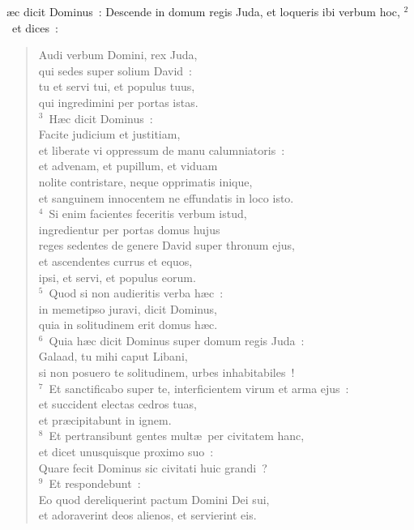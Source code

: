\bchapter
{}\ae c dicit Dominus~: Descende in domum regis Juda, et loqueris ibi verbum hoc,
${}^{2}$~et dices~: \begin{verse}Audi verbum Domini, rex Juda,\\ qui sedes super solium David~:\\ tu et servi tui, et populus tuus,\\ qui ingredimini per portas istas.\\
${}^{3}$~H\ae c dicit Dominus~:\\ Facite judicium et justitiam,\\ et liberate vi oppressum de manu calumniatoris~:\\ et advenam, et pupillum, et viduam\\ nolite contristare, neque opprimatis inique,\\ et sanguinem innocentem ne effundatis in loco isto.\\
${}^{4}$~Si enim facientes feceritis verbum istud,\\ ingredientur per portas domus hujus\\ reges sedentes de genere David super thronum ejus,\\ et ascendentes currus et equos,\\ ipsi, et servi, et populus eorum.\\
${}^{5}$~Quod si non audieritis verba h\ae c~:\\ in memetipso juravi, dicit Dominus,\\ quia in solitudinem erit domus h\ae c.\\
${}^{6}$~Quia h\ae c dicit Dominus super domum regis Juda~:\\ Galaad, tu mihi caput Libani,\\ si non posuero te solitudinem, urbes inhabitabiles~!\\
${}^{7}$~Et sanctificabo super te, interficientem virum et arma ejus~:\\ et succident electas cedros tuas,\\ et pr\ae cipitabunt in ignem.\\
${}^{8}$~Et pertransibunt gentes mult\ae\ per civitatem hanc,\\ et dicet unusquisque proximo suo~:\\ Quare fecit Dominus sic civitati huic grandi~?\\
${}^{9}$~Et respondebunt~:\\ Eo quod dereliquerint pactum Domini Dei sui,\\ et adoraverint deos alienos, et servierint eis.\\

\end{verse}
